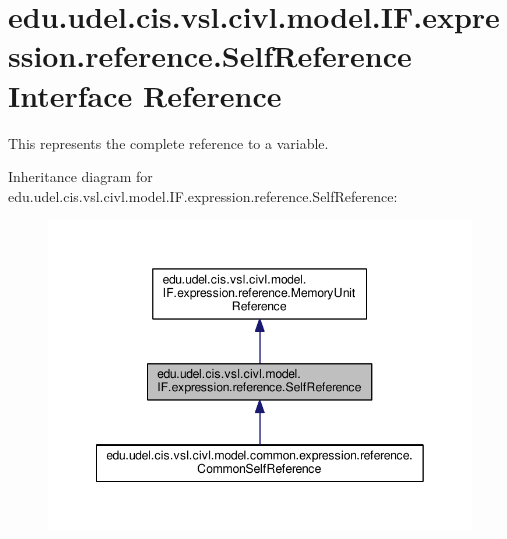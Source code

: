 \hypertarget{interfaceedu_1_1udel_1_1cis_1_1vsl_1_1civl_1_1model_1_1IF_1_1expression_1_1reference_1_1SelfReference}{}\section{edu.\+udel.\+cis.\+vsl.\+civl.\+model.\+I\+F.\+expression.\+reference.\+Self\+Reference Interface Reference}
\label{interfaceedu_1_1udel_1_1cis_1_1vsl_1_1civl_1_1model_1_1IF_1_1expression_1_1reference_1_1SelfReference}


This represents the complete reference to a variable.  




Inheritance diagram for edu.\+udel.\+cis.\+vsl.\+civl.\+model.\+I\+F.\+expression.\+reference.\+Self\+Reference\+:
\nopagebreak
\begin{figure}[H]
\begin{center}
\leavevmode
\includegraphics[width=349pt]{interfaceedu_1_1udel_1_1cis_1_1vsl_1_1civl_1_1model_1_1IF_1_1expression_1_1reference_1_1SelfReference__inherit__graph}
\end{center}
\end{figure}


